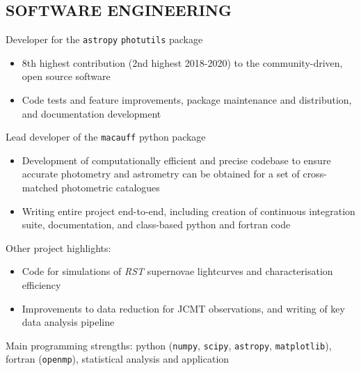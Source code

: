 \documentclass[letter, margin, 10pt]{res} %
\begin{document}
\begin{resume}
\vspace{-6pt}
\section{SOFTWARE ENGINEERING}

Developer for the \texttt{astropy} \texttt{photutils} package
\begin{itemize}[noitemsep,topsep=0pt,parsep=0pt,partopsep=0pt]
\item 8th highest contribution (2nd highest 2018-2020) to the community-driven, open source software
\item Code tests and feature improvements, package maintenance and distribution, and documentation development
\end{itemize}
\vspace{-10pt}
Lead developer of the \texttt{macauff} python package
\begin{itemize}[noitemsep,topsep=0pt,parsep=0pt,partopsep=0pt]
\item Development of computationally efficient and precise codebase to ensure accurate photometry and astrometry can be obtained for a set of cross-matched photometric catalogues
\item Writing entire project end-to-end, including creation of continuous integration suite, documentation, and class-based python and fortran code
\end{itemize}
\vspace{-10pt}
Other project highlights:
\begin{itemize}[noitemsep,topsep=0pt,parsep=0pt,partopsep=0pt]
\item Code for simulations of \textit{RST} supernovae lightcurves and characterisation efficiency
\item Improvements to data reduction for JCMT observations, and writing of key data analysis pipeline
\end{itemize}
\vspace{-10pt}
Main programming strengths: python (\texttt{numpy}, \texttt{scipy}, \texttt{astropy}, \texttt{matplotlib}), fortran (\texttt{openmp}), statistical analysis and application

\parskip 5pt
\vspace{-6pt}

\end{resume}
\end{document}
